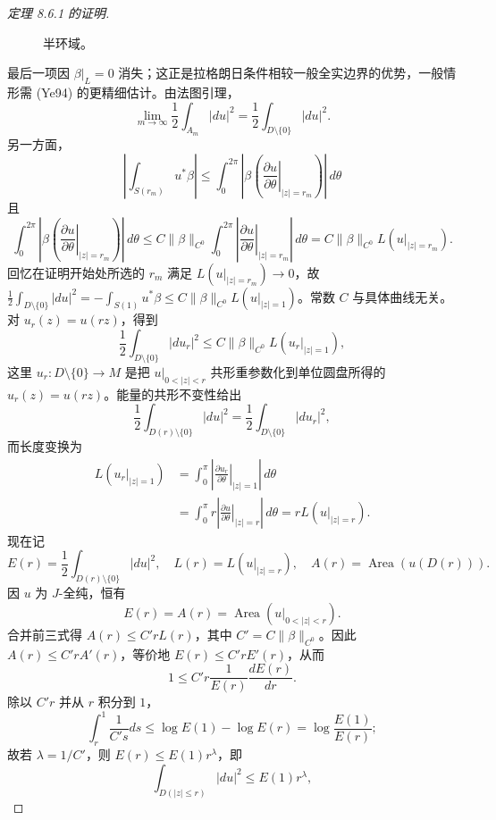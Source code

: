 \begin{proof}[定理 8.6.1 的证明]
\begin{figure}[htbp]
\caption{半环域。}\label{fig:ch8-semiannulus}
\end{figure}
最后一项因 $\beta|_L=0$ 消失；这正是拉格朗日条件相较一般全实边界的优势，一般情形需 (Ye94) 的更精细估计。由法图引理，
\[
 \lim_{m\to\infty}\frac12\int_{A_m}|du|^2
 =\frac12\int_{D\setminus\{0\}}|du|^2.
\]
另一方面，
\[
 \left|\int_{S(r_m)}u^*\beta\right|
 \leq\int_0^{2\pi}\left|\beta\left(
 \left.\frac{\partial u}{\partial\theta}\right|_{|z|=r_m}
 \right)\right|\,d\theta
\]
且
\[
 \int_0^{2\pi}\left|\beta\left(
 \left.\frac{\partial u}{\partial\theta}\right|_{|z|=r_m}
 \right)\right|\,d\theta
 \leq C\|\beta\|_{C^0}\int_0^{2\pi}
 \left|\left.\frac{\partial u}{\partial\theta}\right|_{|z|=r_m}\right|\,d\theta
 =C\|\beta\|_{C^0}L(u|_{|z|=r_m}).
\]
回忆在证明开始处所选的 $r_m$ 满足 $L(u|_{|z|=r_m})\to0$，故
$\frac12\int_{D\setminus\{0\}}|du|^2=-\int_{S(1)}u^*\beta
\leq C\|\beta\|_{C^0}L(u|_{|z|=1})$。常数 $C$ 与具体曲线无关。对
$u_r(z)=u(rz)$，得到
\begin{equation}\frac12\int_{D\setminus\{0\}}|du_r|^2\leq C\|\beta\|_{C^0}L(u_r|_{|z|=1}),\label{eq:ch8-rescaled-isoperimetric}\end{equation}
这里 $u_r:D\setminus\{0\}\to M$ 是把 $u|_{0<|z|<r}$ 共形重参数化到单位圆盘所得的
$u_r(z)=u(rz)$。能量的共形不变性给出
\[
 \frac12\int_{D(r)\setminus\{0\}}|du|^2
 =\frac12\int_{D\setminus\{0\}}|du_r|^2,
\]
而长度变换为
\begin{equation}
 \begin{split}
 L(u_r|_{|z|=1})
 &=\int_0^\pi\left|\left.\frac{\partial u_r}{\partial\theta}\right|_{|z|=1}\right|\,d\theta\\
 &=\int_0^\pi r\left|\left.\frac{\partial u}{\partial\theta}\right|_{|z|=r}\right|\,d\theta
 =rL(u|_{|z|=r}).
 \end{split}
 \label{eq:ch8-length-rescaling}
\end{equation}
现在记
\[
 E(r)=\frac12\int_{D(r)\setminus\{0\}}|du|^2,\quad
 L(r)=L(u|_{|z|=r}),\quad A(r)=\operatorname{Area}(u(D(r))).
\]
因 $u$ 为 $J$-全纯，恒有
\begin{equation}E(r)=A(r)=\operatorname{Area}(u|_{0<|z|<r}).\label{eq:ch8-energy-area-identity}\end{equation}
合并前三式得 $A(r)\leq C'rL(r)$，其中 $C'=C\|\beta\|_{C^0}$。因此
$A(r)\leq C'rA'(r)$，等价地 $E(r)\leq C'rE'(r)$，从而
\[
 1\leq C'r\frac1{E(r)}\frac{dE(r)}{dr}.
\]
除以 $C'r$ 并从 $r$ 积分到 $1$，
\[
 \int_r^1\frac1{C's}ds\leq\log E(1)-\log E(r)
 =\log\frac{E(1)}{E(r)};
\]
故若 $\lambda=1/C'$，则 $E(r)\leq E(1)r^\lambda$，即
\begin{equation}\int_{D(|z|\leq r)}|du|^2\leq E(1)r^\lambda,\label{eq:ch8-energy-power-decay}\end{equation}

\end{proof}
